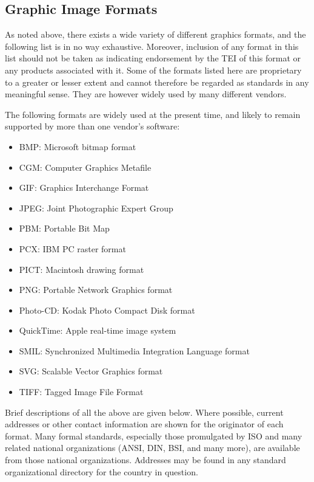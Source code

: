 \subsection[{Graphic Image Formats}]{Graphic Image Formats}\label{FTGRNO}\par
As noted above, there exists a wide variety of different graphics formats, and the following list is in no way exhaustive. Moreover, inclusion of any format in this list should not be taken as indicating endorsement by the TEI of this format or any products associated with it. Some of the formats listed here are proprietary to a greater or lesser extent and cannot therefore be regarded as standards in any meaningful sense. They are however widely used by many different vendors.\par
The following formats are widely used at the present time, and likely to remain supported by more than one vendor's software: \begin{itemize}
\item BMP: Microsoft bitmap format
\item CGM: Computer Graphics Metafile
\item GIF: Graphics Interchange Format
\item JPEG: Joint Photographic Expert Group
\item PBM: Portable Bit Map
\item PCX: IBM PC raster format
\item PICT: Macintosh drawing format
\item PNG: Portable Network Graphics format
\item Photo-CD: Kodak Photo Compact Disk format
\item QuickTime: Apple real-time image system
\item SMIL: Synchronized Multimedia Integration Language format
\item SVG: Scalable Vector Graphics format
\item TIFF: Tagged Image File Format
\end{itemize} \par
Brief descriptions of all the above are given below. Where possible, current addresses or other contact information are shown for the originator of each format. Many formal standards, especially those promulgated by ISO and many related national organizations (ANSI, DIN, BSI, and many more), are available from those national organizations. Addresses may be found in any standard organizational directory for the country in question. 
